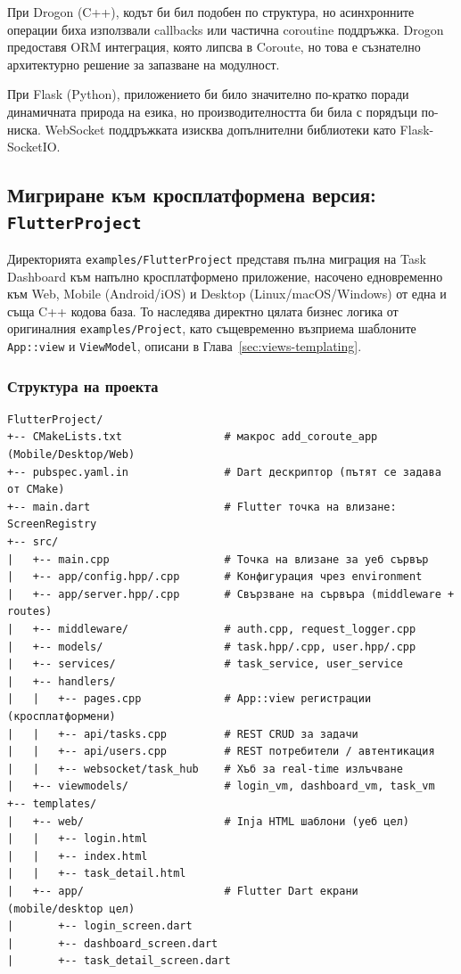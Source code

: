 При Drogon (C++), кодът би бил подобен по структура, но асинхронните операции биха използвали callbacks или частична coroutine поддръжка. Drogon предоставя ORM интеграция, която липсва в Coroute, но това е съзнателно архитектурно решение за запазване на модулност.

При Flask (Python), приложението би било значително по-кратко поради динамичната природа на езика, но производителността би била с порядъци по-ниска. WebSocket поддръжката изисква допълнителни библиотеки като Flask-SocketIO.

\subsection{Мигриране към кросплатформена версия: \texttt{FlutterProject}}
\label{sec:flutter-project-bg}

Директорията \texttt{examples/FlutterProject} представя пълна миграция на Task Dashboard към напълно кросплатформено приложение, насочено едновременно към Web, Mobile (Android/iOS) и Desktop (Linux/macOS/Windows) от една и съща C++ кодова база. То наследява директно цялата бизнес логика от оригиналния \texttt{examples/Project}, като същевременно възприема шаблоните \texttt{App::view} и \texttt{ViewModel}, описани в Глава~\ref{sec:views-templating}.

\subsubsection{Структура на проекта}

\begin{lstlisting}[basicstyle=\small\ttfamily, frame=none, numbers=none]
FlutterProject/
+-- CMakeLists.txt                # макрос add_coroute_app (Mobile/Desktop/Web)
+-- pubspec.yaml.in               # Dart дескриптор (пътят се задава от CMake)
+-- main.dart                     # Flutter точка на влизане: ScreenRegistry
+-- src/
|   +-- main.cpp                  # Точка на влизане за уеб сървър
|   +-- app/config.hpp/.cpp       # Конфигурация чрез environment
|   +-- app/server.hpp/.cpp       # Свързване на сървъра (middleware + routes)
|   +-- middleware/               # auth.cpp, request_logger.cpp
|   +-- models/                   # task.hpp/.cpp, user.hpp/.cpp
|   +-- services/                 # task_service, user_service
|   +-- handlers/
|   |   +-- pages.cpp             # App::view регистрации (кросплатформени)
|   |   +-- api/tasks.cpp         # REST CRUD за задачи
|   |   +-- api/users.cpp         # REST потребители / автентикация
|   |   +-- websocket/task_hub    # Хъб за real-time излъчване
|   +-- viewmodels/               # login_vm, dashboard_vm, task_vm
+-- templates/
|   +-- web/                      # Inja HTML шаблони (уеб цел)
|   |   +-- login.html
|   |   +-- index.html
|   |   +-- task_detail.html
|   +-- app/                      # Flutter Dart екрани (mobile/desktop цел)
|       +-- login_screen.dart
|       +-- dashboard_screen.dart
|       +-- task_detail_screen.dart
\end{lstlisting}

